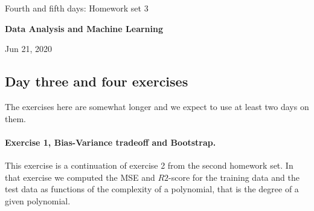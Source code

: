 \documentclass[%
oneside,                 %
final,                   %
10pt]{article}
\begin{document}

\newcommand{\exercisesection}[1]{\subsection*{#1}}






\thispagestyle{empty}

\begin{center}
{\LARGE\bf
\begin{spacing}{1.25}
Fourth and fifth days: Homework set 3
\end{spacing}
}
\end{center}


\begin{center}
{\bf Data Analysis and Machine Learning${}^{}$} \\ [0mm]
\end{center}

\begin{center}
\end{center}
    

\begin{center}
Jun 21, 2020
\end{center}

\vspace{1cm}


\subsection{Day three and four exercises}

The exercises here are somewhat longer and we expect to use at least two days on them.

\paragraph{Exercise 1, Bias-Variance tradeoff and Bootstrap.}
This exercise is a continuation of exercise 2 from the second homework set.
In that exercise we computed the MSE and $R2$-score for the training
data and the test data as functions of the complexity of a polynomial,
that is the degree of a given polynomial.
\end{document}
